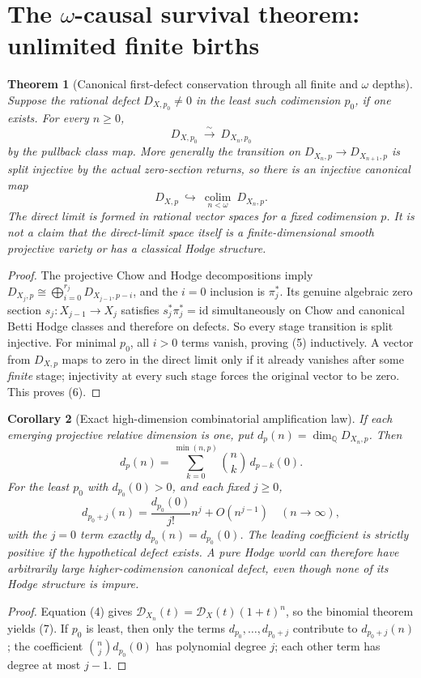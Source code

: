 \documentclass[11pt]{article}
\newtheorem{theorem}{Theorem}
\newtheorem{corollary}[theorem]{Corollary}
\begin{document}
\section{The \(\omega\)-causal survival theorem: unlimited finite births}
\begin{theorem}[Canonical first-defect conservation through all finite and \(\omega\) depths]
Suppose the rational defect \(D_{X,p_0}\ne0\) in the least such
codimension \(p_0\), if one exists. For every \(n\ge0\),
\[
 \boxed{D_{X,p_0}\ \xrightarrow{\sim}\
              D_{X_n,p_0}}                                   \tag{5}
\]
by the pullback class map. More generally the transition on
\(D_{X_n,p}\to D_{X_{n+1},p}\) is split injective by the
actual zero-section returns, so there is an injective
canonical map
\[
 \boxed{
 D_{X,p}\ \hookrightarrow\
 \underset{n<\omega}{\operatorname{colim}}\ D_{X_n,p}.}         \tag{6}
\]
The direct limit is formed in rational vector spaces for a
\emph{fixed codimension \(p\)}. It is not a claim that the
direct-limit space itself is a finite-dimensional smooth
projective variety or has a classical Hodge structure.
\end{theorem}
\begin{proof}
The projective Chow and Hodge decompositions imply
\(D_{X_{j},p}\cong
 \bigoplus_{i=0}^{r_j}D_{X_{j-1},p-i}\),
and the \(i=0\) inclusion is \(\pi_j^*\).
Its genuine algebraic zero section
\(s_j:X_{j-1}\to X_j\) satisfies
\(s_j^*\pi_j^*=\mathrm{id}\) simultaneously on Chow and
canonical Betti Hodge classes and therefore on defects.
So every stage transition is split injective.
For minimal \(p_0\), all \(i>0\) terms vanish, proving (5)
inductively. A vector from \(D_{X,p}\) maps to zero in the
direct limit only if it already vanishes after some
\emph{finite} stage; injectivity at every such stage
forces the original vector to be zero. This proves (6).
\end{proof}

\begin{corollary}[Exact high-dimension combinatorial amplification law]
If each emerging projective relative dimension is one, put
\(d_p(n)=\dim_{\mathbb Q}D_{X_n,p}\). Then
\[
 \boxed{d_p(n)=\sum_{k=0}^{\min(n,p)}
           {n\choose k}\,d_{p-k}(0).}                        \tag{7}
\]
For the least \(p_0\) with \(d_{p_0}(0)>0\), and each
fixed \(j\ge0\),
\[
 \boxed{d_{p_0+j}(n)=
       \frac{d_{p_0}(0)}{j!}n^j+O(n^{j-1})}
       \quad(n\to\infty),                                   \tag{8}
\]
with the \(j=0\) term exactly \(d_{p_0}(n)=d_{p_0}(0)\).
The leading coefficient is \emph{strictly positive} if
the hypothetical defect exists. A pure Hodge world can
therefore have arbitrarily large higher-codimension
canonical defect, even though none of its Hodge structure
is impure.
\end{corollary}
\begin{proof}
Equation (4) gives
\(\mathcal D_{X_n}(t)=\mathcal D_X(t)(1+t)^n\),
so the binomial theorem yields (7).
If \(p_0\) is least, then only the terms
\(d_{p_0},\ldots,d_{p_0+j}\) contribute to
\(d_{p_0+j}(n)\); the coefficient
\({n\choose j}d_{p_0}(0)\) has polynomial degree \(j\);
each other term has degree at most \(j-1\).
\end{proof}
\end{document}
